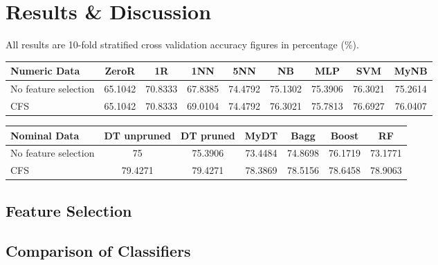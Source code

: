 \section{Results \& Discussion}


All results are 10-fold stratified cross validation accuracy figures in percentage (\%).

\begin{tabular}{|m{2cm}*{8}{|c}|}
    \hline
    Numeric Data & ZeroR & 1R & 1NN &5NN &NB &MLP &SVM & MyNB \\
    \hline
    No feature selection & 65.1042 &70.8333 &67.8385 &74.4792 &75.1302 &75.3906 &76.3021 &75.2614 \\
    \hline
    CFS & 65.1042 &70.8333 &69.0104 &74.4792 &76.3021 &75.7813&76.6927 & 76.0407 \\
    \hline
\end{tabular}

\begin{tabular}{|m{2cm}*{6}{|c}|}
    \hline
    Nominal Data & DT unpruned &DT pruned &MyDT &Bagg &Boost &RF \\
    \hline
    No feature selection &75 & 75.3906 &73.4484 &74.8698&76.1719&73.1771 \\
    \hline
    CFS & 79.4271 & 79.4271 &78.3869 & 78.5156 & 78.6458 & 78.9063 \\
    \hline
\end{tabular}

\begin{obeylines}
    
    
\end{obeylines}


\subsection{Feature Selection}


\subsection{Comparison of Classifiers}


